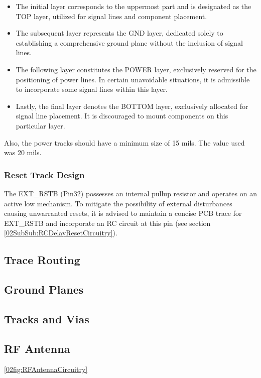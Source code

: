 \begin{itemize}
    \item The initial layer corresponds to the uppermost part and is designated as the TOP layer, utilized for 
    signal lines and component placement.
    \item The subsequent layer represents the GND layer, dedicated solely to establishing a comprehensive ground plane without 
    the inclusion of signal lines.
    \item The following layer constitutes the POWER layer, exclusively reserved for the positioning of power lines. In certain 
    unavoidable situations, it is admissible to incorporate some signal lines within this layer.
    \item Lastly, the final layer denotes the BOTTOM layer, exclusively allocated for signal line placement. It is discouraged 
    to mount components on this particular layer.
\end{itemize}

Also, the power tracks should have a minimum size of 15 mils. The value used was 20 mils.

\subsubsection{Reset Track Design}\label{02SubSub:ResetTrackDesign}

The EXT\_RSTB (Pin32) possesses an internal pullup resistor and operates on an active low mechanism. To mitigate the possibility
of external disturbances causing unwarranted resets, it is advised to maintain a concise PCB trace for EXT\_RSTB and 
incorporate an RC circuit at this pin \cite{ESP8266HGL} (see section \ref{02SubSub:RCDelayResetCircuitry}).




\subsection{Trace Routing}\label{03Sub:TraceRouting}




\subsection{Ground Planes}\label{03Sub:Ground planes}


\subsection{Tracks and Vias}\label{03Sub:HolesAndVias}



\subsection{RF Antenna}\label{03Sub:RFAntenna}

\cite{ESP8266HGL}
\ref{02fig:RFAntennaCircuitry}




